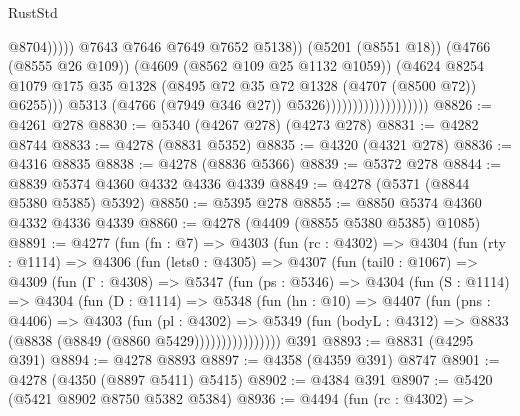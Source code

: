 \begin{lexlean}{RustStd}
\begin{coremodule}
                                                          @8704)))))
                                                @7643
                                                @7646
                                                @7649
                                                @7652
                                                @5138))
                                            (@5201 (@8551 @18))
                                            (@4766 (@8555 @26 @109))
                                            (@4609 (@8562 @109 @25 @1132 @1059))
                                            (@4624
                                              @8254
                                              @1079
                                              @175
                                              @35
                                              @1328
                                              (@8495 @72 @35 @72 @1328 (@4707 (@8500 @72)) @6255)))
                                          @5313
                                          (@4766 (@7949 @346 @27))
                                          @5326)))))))))))))))))))
@8826 := @4261 @278
@8830 := @5340 (@4267 @278) (@4273 @278)
@8831 := @4282 @8744
@8833 := @4278 (@8831 @5352)
@8835 := @4320 (@4321 @278)
@8836 := @4316 @8835
@8838 := @4278 (@8836 @5366)
@8839 := @5372 @278
@8844 := @8839 @5374 @4360 @4332 @4336 @4339
@8849 := @4278 (@5371 (@8844 @5380 @5385) @5392)
@8850 := @5395 @278
@8855 := @8850 @5374 @4360 @4332 @4336 @4339
@8860 := @4278 (@4409 (@8855 @5380 @5385) @1085)
@8891 := @4277
    (fun (fn : @7) =>
    @4303
      (fun (rc : @4302) =>
      @4304
        (fun (rty : @1114) =>
        @4306
          (fun (lets0 : @4305) =>
          @4307
            (fun (tail0 : @1067) =>
            @4309
              (fun (Γ : @4308) =>
              @5347
                (fun (ps : @5346) =>
                @4304
                  (fun (S : @1114) =>
                  @4304
                    (fun (D : @1114) =>
                    @5348
                      (fun (hn : @10) =>
                      @4407
                        (fun (pns : @4406) =>
                        @4303
                          (fun (pl : @4302) =>
                          @5349
                            (fun (bodyL : @4312) => @8833 (@8838 (@8849 (@8860 @5429))))))))))))))))
    @391
@8893 := @8831 (@4295 @391)
@8894 := @4278 @8893
@8897 := @4358 (@4359 @391) @8747
@8901 := @4278 (@4350 (@8897 @5411) @5415)
@8902 := @4384 @391
@8907 := @5420 (@5421 @8902 @8750 @5382 @5384)
@8936 := @4494
    (fun (rc : @4302) =>

\end{coremodule}
\end{lexlean}
